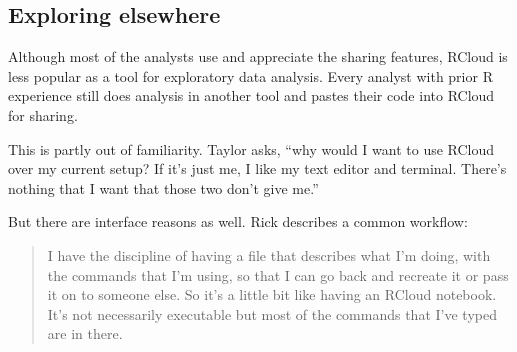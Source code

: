 


\subsection{Exploring elsewhere}

Although most of the analysts use and appreciate the sharing features,
RCloud is less popular as a tool for exploratory data analysis. Every
analyst with prior R experience still does analysis in another tool and
pastes their code into RCloud for sharing.

This is partly out of familiarity. Taylor asks, ``why would I want to use
RCloud over my current setup? If it's just me, I like my text editor and
terminal. There's nothing that I want that those two don't give me.''



But there are interface reasons as well. Rick describes a common workflow:
\begin{quote}
I have the discipline of having a file that describes what I'm doing, with the
commands that I'm using, so that I can go back and recreate it or pass it on to
someone else. So it's a little bit like having an RCloud notebook. It's not
necessarily executable but most of the commands that I've typed are in there.
\end{quote}

